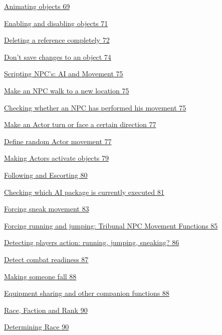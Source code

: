 \documentclass[
]{article}
\begin{document}
\protect\hyperlink{animating-objects}{Animating objects 69}

\protect\hyperlink{enabling-and-disabling-objects}{Enabling and
disabling objects 71}

\protect\hyperlink{deleting-a-reference-completely}{Deleting a reference
completely 72}

\protect\hyperlink{dont-save-changes-to-an-object}{Don't save changes to
an object 74}

\protect\hyperlink{scripting-npcs-ai-and-movement}{Scripting NPC's: AI
and Movement 75}

\protect\hyperlink{make-an-npc-walk-to-a-new-location}{Make an NPC walk
to a new location 75}

\protect\hyperlink{checking-whether-an-npc-has-performed-his-movement}{Checking
whether an NPC has performed his movement 75}

\protect\hyperlink{make-an-actor-turn-or-face-a-certain-direction}{Make
an Actor turn or face a certain direction 77}

\protect\hyperlink{define-random-actor-movement}{Define random Actor
movement 77}

\protect\hyperlink{making-actors-activate-objects}{Making Actors
activate objects 79}

\protect\hyperlink{following-and-escorting}{Following and Escorting 80}

\protect\hyperlink{checking-which-ai-package-is-currently-executed}{Checking
which AI package is currently executed 81}

\protect\hyperlink{forcing-sneak-movement}{Forcing sneak movement 83}

\protect\hyperlink{forcing-running-and-jumping-tribunal-npc-movement-functions}{Forcing
running and jumping: Tribunal NPC Movement Functions 85}

\protect\hyperlink{detecting-players-action-running-jumping-sneaking}{Detecting
players action: running, jumping, sneaking? 86}

\protect\hyperlink{detect-combat-readiness}{Detect combat readiness 87}

\protect\hyperlink{section-7}{Making someone fall 88}

\protect\hyperlink{equipment-sharing-and-other-companion-functions}{Equipment
sharing and other companion functions 88}

\protect\hyperlink{race-faction-and-rank}{Race, Faction and Rank 90}

\protect\hyperlink{determining-race}{Determining Race 90}
\end{document}
